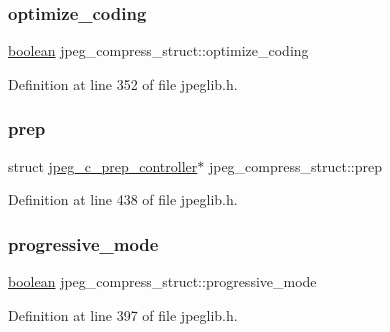 \subsubsection{\texorpdfstring{optimize\_coding}{optimize\_coding}}
{\footnotesize\ttfamily \mbox{\hyperlink{jmorecfg_8h_a7c6368b321bd9acd0149b030bb8275ed}{boolean}} jpeg\+\_\+compress\+\_\+struct\+::optimize\+\_\+coding}



Definition at line 352 of file jpeglib.\+h.

\mbox{\label{structjpeg__compress__struct_a66875fd858cd11fb7a696a717c5c7b76}} 
\subsubsection{\texorpdfstring{prep}{prep}}
{\footnotesize\ttfamily struct \mbox{\hyperlink{structjpeg__c__prep__controller}{jpeg\+\_\+c\+\_\+prep\+\_\+controller}}$\ast$ jpeg\+\_\+compress\+\_\+struct\+::prep}



Definition at line 438 of file jpeglib.\+h.

\mbox{\label{structjpeg__compress__struct_ae3b16d173e7feef7b6b0e823fd2fde3f}} 
\subsubsection{\texorpdfstring{progressive\_mode}{progressive\_mode}}
{\footnotesize\ttfamily \mbox{\hyperlink{jmorecfg_8h_a7c6368b321bd9acd0149b030bb8275ed}{boolean}} jpeg\+\_\+compress\+\_\+struct\+::progressive\+\_\+mode}



Definition at line 397 of file jpeglib.\+h.

\mbox{\label{structjpeg__compress__struct_a3d8545504353556fae60e1e865d2c600}} 
